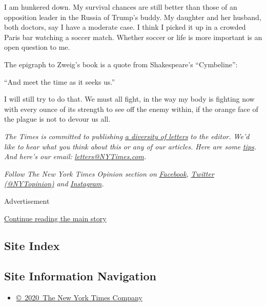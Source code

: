 I am hunkered down. My survival chances are still better than those of
an opposition leader in the Russia of Trump's buddy. My daughter and her
husband, both doctors, say I have a moderate case. I think I picked it
up in a crowded Paris bar watching a soccer match. Whether soccer or
life is more important is an open question to me.

The epigraph to Zweig's book is a quote from Shakespeare's
``Cymbeline'':

``And meet the time as it seeks us.''

I will still try to do that. We must all fight, in the way my body is
fighting now with every ounce of its strength to see off the enemy
within, if the orange face of the plague is not to devour us all.

\emph{The Times is committed to publishing}
\href{https://www.nytimes3xbfgragh.onion/2019/01/31/opinion/letters/letters-to-editor-new-york-times-women.html}{\emph{a
diversity of letters}} \emph{to the editor. We'd like to hear what you
think about this or any of our articles. Here are some}
\href{https://help.nytimes3xbfgragh.onion/hc/en-us/articles/115014925288-How-to-submit-a-letter-to-the-editor}{\emph{tips}}\emph{.
And here's our email:}
\href{mailto:letters@NYTimes.com}{\emph{letters@NYTimes.com}}\emph{.}

\emph{Follow The New York Times Opinion section on}
\href{https://www.facebookcorewwwi.onion/nytopinion}{\emph{Facebook}}\emph{,}
\href{http://twitter.com/NYTOpinion}{\emph{Twitter (@NYTopinion)}}
\emph{and}
\href{https://www.instagram.com/nytopinion/}{\emph{Instagram}}\emph{.}

Advertisement

\protect\hyperlink{after-bottom}{Continue reading the main story}

\hypertarget{site-index}{%
\subsection{Site Index}\label{site-index}}

\hypertarget{site-information-navigation}{%
\subsection{Site Information
Navigation}\label{site-information-navigation}}

\begin{itemize}
\tightlist
\item
  \href{https://help.nytimes3xbfgragh.onion/hc/en-us/articles/115014792127-Copyright-notice}{©~2020~The
  New York Times Company}
\end{itemize}

